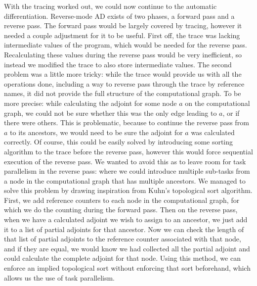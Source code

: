     With the tracing worked out, we could now continue to the automatic differentiation.
    Reverse-mode AD exists of two phases, a forward pass and a reverse pass.
    The forward pass would be largely covered by tracing, however it needed a couple adjustment for it to be useful.
    First off, the trace was lacking intermediate values of the program, which would be needed for the reverse pass.
    Recalculating these values during the reverse pass would be very inefficient, so instead we modified the trace to also store intermediate values.
    The second problem was a little more tricky: while the trace would provide us with all the operations done, including a way to reverse pass through the trace by reference names, it did not provide the full structure of the computational graph.
    To be more precise: while calculating the adjoint for some node $a$ on the computational graph, we could not be sure whether this was the only edge leading to $a$, or if there were others.
    This is problematic, because to continue the reverse pass from $a$ to its ancestors, we would need to be sure the adjoint for $a$ was calculated correctly.
    Of course, this could be easily solved by introducing some sorting algorithm to the trace before the reverse pass, however this would force sequential execution of the reverse pass.
    We wanted to avoid this as to leave room for task parallelism in the reverse pass: where we could introduce multiple sub-tasks from a node in the computational graph that has multiple ancestors.
    We managed to solve this problem by drawing inspiration from Kuhn's topological sort algorithm.
    First, we add reference counters to each node in the computational graph, for which we do the counting during the forward pass.
    Then on the reverse pass, when we have a calculated adjoint we wish to assign to an ancestor, we just add it to a list of partial adjoints for that ancestor.
    Now we can check the length of that list of partial adjoints to the reference counter associated with that node, and if they are equal, we would know we had collected all the partial adjoint and could calculate the complete adjoint for that node.
    Using this method, we can enforce an implied topological sort without enforcing that sort beforehand, which allows us the use of task parallelism.
    
